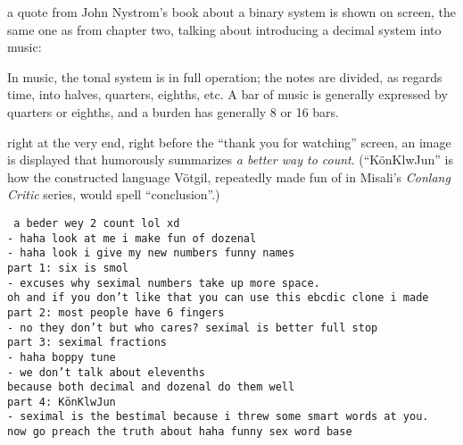 \documentclass[../footnotes.tex]{subfiles}
\begin{document}
 a quote from John Nystrom's book about a binary system is shown on screen, the same one as from chapter two, talking about introducing a decimal system into music:

\begin{quoting}
    In music, the tonal system is in full operation; the notes are divided, as regards time, into halves, quarters, eighths, etc. A bar of music is generally expressed by quarters or eighths, and a burden has generally 8 or 16 bars.
\end{quoting}

 right at the very end, right before the ``thank you for watching'' screen, an image is displayed that humorously summarizes {\it a better way to count}. (``K\"onKlwJun'' is how the constructed language V\"otgil, repeatedly made fun of in Misali's {\it Conlang Critic} series, would spell ``conclusion''.)

{ \tt
a beder wey 2 count lol xd \\
- haha look at me i make fun of dozenal \\
- haha look i give my new numbers funny names \\
part 1: six is smol \\
- excuses why seximal numbers take up more space. \\
oh and if you don't like that you can use this ebcdic clone i made \\
part 2: most people have 6 fingers \\
- no they don't but who cares? seximal is better full stop \\
part 3: seximal fractions \\
- haha boppy tune \\
- we don't talk about elevenths \\
because both decimal and dozenal do them well \\
part 4: K\"onKlwJun \\
- seximal is the bestimal because i threw some smart words at you. \\
now go preach the truth about haha funny sex word base
}
\end{document}
